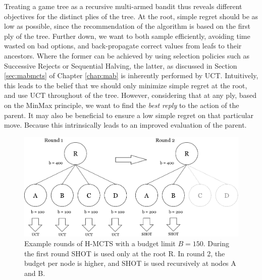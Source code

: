 \documentclass{kecsmstr}
\begin{document}
Treating a game tree as a recursive multi-armed bandit thus reveals different objectives for the distinct plies of the tree. At the root, simple regret should be as low as possible, since the recommendation of the algorithm is based on the first ply of the tree. Further down, we want to both sample efficiently, avoiding time wasted on bad options, and back-propagate correct values from leafs to their ancestors. Where the former can be achieved by using selection policies such as Successive Rejects or Sequential Halving, the latter, as discussed in Section \ref{sec:mabmcts} of Chapter \ref{chap:mab} is inherently performed by UCT. Intuitively, this leads to the belief that we should only minimize simple regret at the root, and use UCT throughout of the tree. However, considering that at any ply, based on the MinMax principle, we want to find the \emph{best reply} to the action of the parent. It may also be beneficial to ensure a low simple regret on that particular move. Because this intrinsically leads to an improved evaluation of the parent.

\begin{figure}[ht]
	\centering
	\includegraphics[width=.8\textwidth]{img/H-MCTS_Rounds.png}
	\caption{Example rounds of H-MCTS with a budget limit $B = 150$. During the first round SHOT is used only at the root R. In round 2, the budget per node is higher, and SHOT is used recursively at nodes A and B.}
	\label{fig:h-mcts_rounds}
\end{figure}
\end{document}
